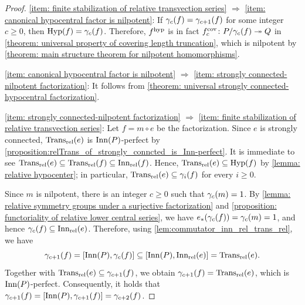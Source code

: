 \begin{proof}
\ref{item: finite stabilization of relative transvection series} $\Rightarrow$ \ref{item: canonical hypocentral factor is nilpotent}:
If $\relTransLCS{c}{f}=\relTransLCS{c+1}{f}$ for some integer $c\geq0$, then $\hypCenter{f}=\relTransLCS{c}{f}$. 
Therefore, $\hypFac{f}$ is in fact $\covTrunc{c}{f}\colon P/\relTransLCS{c}{f} \twoheadrightarrow Q$ in \cref{theorem: universal property of covering length truncation}, which is nilpotent by \cref{theorem: main structure theorem for nilpotent homomorphisms}.

\ref{item: canonical hypocentral factor is nilpotent} $\Rightarrow$ \ref{item: strongly connected-nilpotent factorization}: It follows from \cref{theorem: universal strongly connected-hypocentral factorization}.

\ref{item: strongly connected-nilpotent factorization} $\Rightarrow$ \ref{item: finite stabilization of relative transvection series}:
Let $f=m\circ e$ be the factorization. 
Since $e$ is strongly connected, $\relTrans(e)$ is $\Inn(P)$-perfect by \cref{proposition:relTrans_of_strongly_conncted_is_Inn-perfect}.
It is immediate to see $\relTrans(e) \subseteq \relTrans(f)\subseteq \relInn(f)$. Hence, $\relTrans(e) \subseteq \hypCenter{f}$ by \cref{lemma: relative hypocenter}; in particular, $\relTrans(e) \subseteq \relTransLCS{i}{f}$ for every $i\geq0$.

Since $m$ is nilpotent, there is an integer $c\geq0$ such that $\relTransLCS{c}{m}=1$. By \cref{lemma: relative symmetry groups under a surjective factorization} and \cref{proposition: functoriality of relative lower central series}, we have $e_*(\relTransLCS{c}{f})=\relTransLCS{c}{m}=1$, and hence $\relTransLCS{c}{f}\subseteq \relInn(e)$. Therefore, using \cref{lem:commutator_inn_rel_trans_rel}, we have
\[ \relTransLCS{c+1}{f} = [\Inn(P),\relTransLCS{c}{f}] \subseteq [\Inn(P),\relInn(e)] = \relTrans(e). \]
Together with $\relTrans(e)\subseteq \relTransLCS{c+1}{f}$, we obtain $\relTransLCS{c+1}{f}=\relTrans(e)$, which is $\Inn(P)$-perfect. Consequently, it holds that $\relTransLCS{c+1}{f}=[\Inn(P),\relTransLCS{c+1}{f}]=\relTransLCS{c+2}{f}$.
\end{proof}



